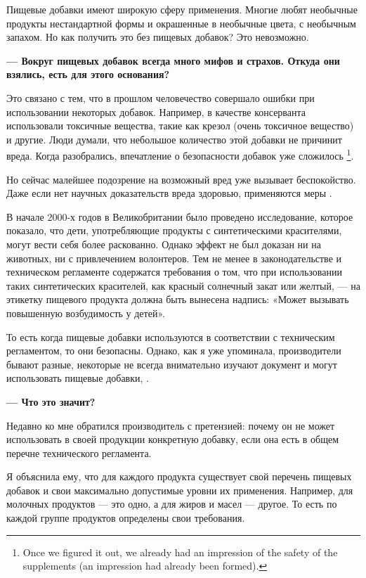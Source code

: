 Пищевые добавки имеют широкую сферу применения.
Многие любят необычные продукты нестандартной формы и окрашенные
в необычные цвета, с необычным запахом.
Но как получить это без пищевых добавок? Это невозможно.

\textbf{--- Вокруг пищевых добавок всегда много мифов и страхов.
    Откуда они взялись, есть для этого основания?}

Это связано с тем, что в прошлом человечество совершало ошибки при
использовании некоторых добавок.
Например, в качестве консерванта использовали токсичные вещества,
такие как крезол (очень токсичное вещество) и другие.
Люди думали, что небольшое количество этой добавки не причинит вреда.
Когда разобрались, впечатление о безопасности добавок уже сложилось%
\footnote{Once we figured it out, we already had an impression of
    the safety of the supplements
    (an impression had already been formed).}.

Но сейчас малейшее подозрение на возможный вред уже вызывает беспокойство.
Даже если нет научных доказательств вреда здоровью,
применяются меры .

В начале 2000-х годов в Великобритании было проведено исследование,
которое показало, что дети, употребляющие продукты с синтетическими
красителями, могут вести себя более раскованно.
Однако эффект не был доказан ни на животных, ни с привлечением волонтеров.
Тем не менее в законодательстве и техническом регламенте содержатся
требования о том, что при использовании таких синтетических красителей,
как красный солнечный закат или желтый, --- на этикетку пищевого продукта
должна быть вынесена надпись: «Может вызывать повышенную возбудимость у детей».

То есть когда пищевые добавки используются в соответствии с
техническим регламентом, то они безопасны.
Однако, как я уже упоминала, производители бывают разные,
некоторые не всегда внимательно изучают документ и могут
использовать пищевые добавки, .

\textbf{--- Что это значит? }

Недавно ко мне обратился производитель с претензией:
почему он не может использовать в своей продукции конкретную добавку,
если она есть в общем перечне технического регламента.

Я объяснила ему, что для каждого продукта существует свой перечень пищевых
добавок и свои максимально допустимые уровни их применения.
Например, для молочных продуктов --- это одно, а для жиров и масел --- другое.
То есть по каждой группе продуктов определены свои требования.

